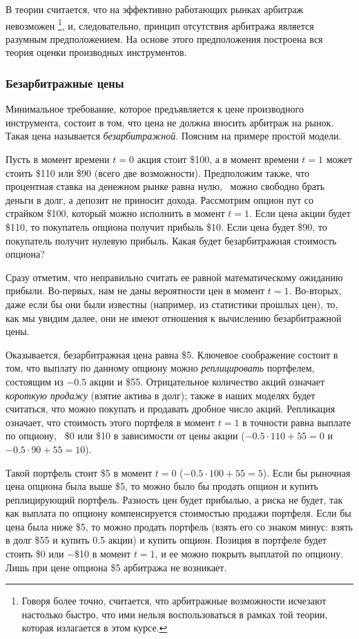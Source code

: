 В теории считается, что на эффективно работающих рынках арбитраж невозможен%
\footnote{Говоря более точно, считается, что арбитражные возможности исчезают настолько быстро, что ими нельзя воспользоваться  в рамках той теории, которая излагается в этом курсе.},
и, следовательно, принцип отсутствия арбитража является разумным предположением.
На основе этого предположения построена вся теория оценки производных инструментов.


\subsubsection{Безарбитражные цены}

Минимальное требование, которое предъявляется к цене производного инструмента, состоит в том, что цена не должна вносить арбитраж на рынок.
Такая цена называется \emph{безарбитражной}.
Поясним на примере простой модели.

\begin{example}
Пусть в момент времени $t=0$ акция стоит \$100, а в момент времени $t=1$ может стоить \$110 или \$90 (всего две возможности).
Предположим также, что процентная ставка на денежном рынке равна нулю, \te\ можно свободно брать деньги в долг, а депозит не приносит дохода.
Рассмотрим опцион пут со страйком \$100, который можно исполнить в момент $t=1$.
Если цена акции будет \$110, то покупатель опциона получит прибыль \$10.
Если цена будет \$90, то покупатель получит нулевую прибыль.
Какая будет безарбитражная стоимость опциона?

Сразу отметим, что неправильно считать ее равной математическому ожиданию прибыли. 
Во-первых, нам не даны вероятности цен в момент $t=1$.
Во-вторых, даже если бы они были известны (например, из статистики прошлых цен), то, как мы увидим далее, они не имеют отношения к вычислению безарбитражной цены.

Оказывается, безарбитражная цена равна \$5.
Ключевое соображение состоит в том, что выплату по данному опциону можно \emph{реплицировать} портфелем, состоящим из $-0.5$ акции и \$55.
Отрицательное количество акций означает \emph{короткую продажу} (взятие актива в долг); также в наших моделях будет считаться, что можно покупать и продавать дробное число акций.
Репликация означает, что стоимость этого портфеля в момент $t=1$ в точности равна выплате по опциону, \te\ \$0 или \$10 в зависимости от цены акции ($-0.5 \cdot 110 + 55 =0$ и $-0.5 \cdot 90 + 55 = 10$).

Такой портфель стоит \$5 в момент $t=0$ ($-0.5 \cdot 100 + 55 = 5$).
Если бы рыночная цена опциона была выше \$5, то можно было бы продать опцион и купить реплицирующий портфель.
Разность цен будет прибылью, а риска не будет, так как выплата по опциону компенсируется стоимостью продажи портфеля.
Если бы цена была ниже \$5, то можно продать портфель (взять его со знаком минус: взять в долг \$55 и купить 0.5 акции) и купить опцион.
Позиция в портфеле будет стоить \$0 или $-$\$10 в момент $t=1$, и ее можно покрыть выплатой по опциону.
Лишь при цене опциона \$5 арбитража не возникает. 
\end{example}


